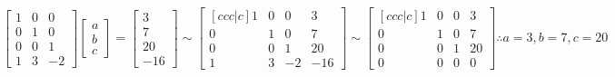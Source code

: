\documentclass[12pt]{article}
\begin{document}
$$
\begin{bmatrix}
   1 & 0 & 0 \\
   0 & 1 & 0 \\
   0 & 0 & 1 \\
   1 & 3 & -2
\end{bmatrix}
\begin{bmatrix}
   a \\
   b \\
   c
\end{bmatrix}
=
\begin{bmatrix}
 3 \\
 7 \\
 20 \\
 -16
\end{bmatrix}
\sim
\begin{bmatrix}[ccc|c]
    1 & 0 & 0 & 3 \\
   0 & 1 & 0 & 7\\
   0 & 0 & 1 & 20\\
   1 & 3 & -2 & -16
\end{bmatrix}
\sim
\begin{bmatrix}[ccc|c]
    1 & 0 & 0 & 3 \\
   0 & 1 & 0 & 7\\
   0 & 0 & 1 & 20\\
   0 & 0 & 0 & 0
\end{bmatrix}
\therefore a=3, b=7,c=20
$$
\end{document}
